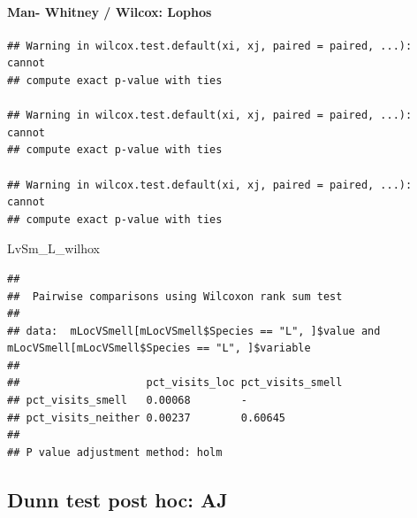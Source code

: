 \documentclass[]{article}
\newenvironment{Shaded}{\begin{snugshade}}{\end{snugshade}}
\newcommand{\KeywordTok}[1]{\textcolor[rgb]{0.13,0.29,0.53}{\textbf{{#1}}}}
\newcommand{\DataTypeTok}[1]{\textcolor[rgb]{0.13,0.29,0.53}{{#1}}}
\newcommand{\StringTok}[1]{\textcolor[rgb]{0.31,0.60,0.02}{{#1}}}
\newcommand{\OtherTok}[1]{\textcolor[rgb]{0.56,0.35,0.01}{{#1}}}
\newcommand{\NormalTok}[1]{{#1}}
\let\oldparagraph\paragraph
\renewcommand{\paragraph}[1]{\oldparagraph{#1}\mbox{}}
\begin{document}
\paragraph{Man- Whitney / Wilcox:
Lophos}\label{man--whitney-wilcox-lophos-1}

\begin{Shaded}
\end{Shaded}

\begin{verbatim}
## Warning in wilcox.test.default(xi, xj, paired = paired, ...): cannot
## compute exact p-value with ties

## Warning in wilcox.test.default(xi, xj, paired = paired, ...): cannot
## compute exact p-value with ties

## Warning in wilcox.test.default(xi, xj, paired = paired, ...): cannot
## compute exact p-value with ties
\end{verbatim}

\begin{Shaded}
\begin{Highlighting}[]
\NormalTok{LvSm_L_wilhox}
\end{Highlighting}
\end{Shaded}

\begin{verbatim}
## 
##  Pairwise comparisons using Wilcoxon rank sum test 
## 
## data:  mLocVSmell[mLocVSmell$Species == "L", ]$value and mLocVSmell[mLocVSmell$Species == "L", ]$variable 
## 
##                    pct_visits_loc pct_visits_smell
## pct_visits_smell   0.00068        -               
## pct_visits_neither 0.00237        0.60645         
## 
## P value adjustment method: holm
\end{verbatim}

\subsection{Dunn test post hoc: AJ}\label{dunn-test-post-hoc-aj-1}

\begin{Shaded}
\end{Shaded}
\end{document}
